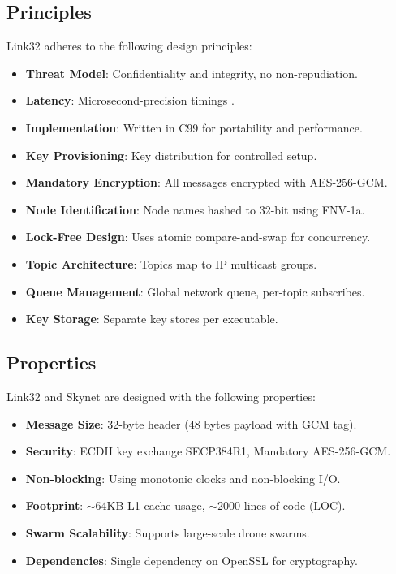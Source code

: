 \documentclass{article}
\begin{document}
\subsection{Principles}
Link32 adheres to the following design principles:
\begin{itemize}
    \item \textbf{Threat Model}: Confidentiality and integrity, no non-repudiation.
    \item \textbf{Latency}: Microsecond-precision timings .
    \item \textbf{Implementation}: Written in C99 for portability and performance.
    \item \textbf{Key Provisioning}: Key distribution for controlled setup.
    \item \textbf{Mandatory Encryption}: All messages encrypted with AES-256-GCM.
    \item \textbf{Node Identification}: Node names hashed to 32-bit using FNV-1a.
    \item \textbf{Lock-Free Design}: Uses atomic compare-and-swap for concurrency.
    \item \textbf{Topic Architecture}: Topics map to IP multicast groups.
    \item \textbf{Queue Management}: Global network queue, per-topic subscribes.
    \item \textbf{Key Storage}: Separate key stores per executable.
\end{itemize}

\newpage

\subsection{Properties}
Link32 and Skynet are designed with the following properties:
\begin{itemize}
    \item \textbf{Message Size}: 32-byte header (48 bytes payload with GCM tag).
    \item \textbf{Security}: ECDH key exchange SECP384R1, Mandatory AES-256-GCM.
    \item \textbf{Non-blocking}: Using monotonic clocks and non-blocking I/O.
    \item \textbf{Footprint}: $\sim$64KB L1 cache usage, $\sim$2000 lines of code (LOC).
    \item \textbf{Swarm Scalability}: Supports large-scale drone swarms.
    \item \textbf{Dependencies}: Single dependency on OpenSSL for cryptography.
\end{itemize}
\end{document}
